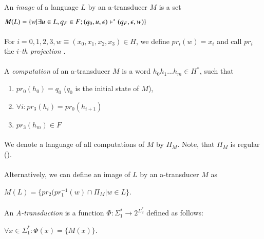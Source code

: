 \paragraph{}
 An \emph{image} of a language $L$ by an a-transducer $M$ is a set \\
\centerline{$M(L) = \{ w|\exists u \in L, q_{F} \in F; (q_{0}, u, \epsilon) \vdash^\ast (q_{F}, \epsilon, w) \} $}

\paragraph{}
 For $i=0,1,2,3, w \equiv (x_{0},x_{1},x_{2},x_{3}) \in H$, we define $pr_{i}(w) = x_{i}$ and call $pr_{i}$ the \emph{$i$-th projection} .

\paragraph{}
 A \emph{computation} of an a-transducer $M$ is a word $h_{0}h_{1}...h_{m} \in H^{*}$, such that
\begin{enumerate}
\item $pr_{0}(h_{0}) = q_{0}$ ($q_{0}$ is the initial state of $M$),
\item $\forall i: pr_{3}(h_{i}) = pr_{0}(h_{i+1})$
\item $pr_{3}(h_{m}) \in F$
\end{enumerate}

\paragraph{}
\oznacenie We denote a language of all computations of $M$ by $\Pi_{M}$. Note, that $\Pi_{M}$ is regular (\cite{gin:AATPFL}).

\paragraph{}
 Alternatively, we can define an image of $L$ by an a-transducer $M$ as \\
\centerline{$M(L) = \{ pr_{2}(pr_{1}^{-1}(w) \cap \Pi_{M} | w \in L \}$.}

\paragraph{}
 An \emph{A-transduction} is a function $\Phi : \Sigma_{1}^{*} \rightarrow 2^{\Sigma_{2}^{*}}$ defined as follows: \\
\centerline{$\forall x \in \Sigma_{1}^{*}: \Phi(x) = \{ M(x) \} $.}

